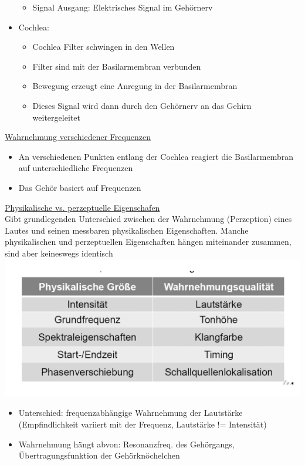 \documentclass[a4paper,10pt,oneside]{article}
\begin{document}
\begin{itemize}
\begin{itemize}
				\item Signal Ausgang: Elektrisches Signal im Gehörnerv
			\end{itemize}
		\item Cochlea:
			\begin{itemize}
				\item Cochlea Filter schwingen in den Wellen
				\item Filter sind mit der Basilarmembran verbunden
				\item Bewegung erzeugt eine Anregung in der Basilarmembran
				\item Dieses Signal wird dann durch den Gehörnerv an das Gehirn weitergeleitet
			\end{itemize}
	\end{itemize}

\underline{Wahrnehmung verschiedener Frequenzen} \\
	\begin{itemize}
		\item An verschiedenen Punkten entlang der Cochlea reagiert die Basilarmembran auf unterschiedliche Frequenzen
		\item Das Gehör basiert auf Frequenzen
	\end{itemize}

\underline{Physikalische vs. perzeptuelle Eigenschafen} \\
Gibt grundlegenden Unterschied zwischen der Wahrnehmung (Perzeption) eines Lautes und seinen messbaren physikalischen Eigenschaften. Manche physikalischen und perzeptuellen Eigenschaften hängen miteinander zusammen, sind aber keineswegs identisch
\includegraphics[scale=0.15]{Grafiken/1255.png}
	\begin{itemize}
		\item Unterschied: frequenzabhängige Wahrnehmung der Lautstärke (Empfindlichkeit variiert mit der Frequenz, Lautstärke != Intensität)
		\item Wahrnehmung hängt abvon: Resonanzfreq. des Gehörgangs, Übertragungsfunktion der Gehörknöchelchen
	\end{itemize}
	
\end{document}

